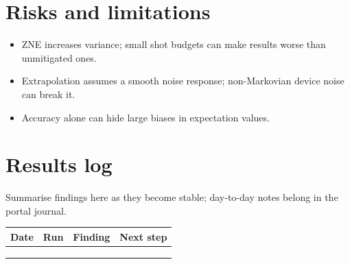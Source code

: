 \documentclass[11pt,a4paper]{article}
\begin{document}
\section{Risks and limitations}
\begin{itemize}
  \item ZNE increases variance; small shot budgets can make results worse than unmitigated ones.
  \item Extrapolation assumes a smooth noise response; non-Markovian device noise can break it.
  \item Accuracy alone can hide large biases in expectation values.
\end{itemize}

\section{Results log}
\label{sec:log}
Summarise findings here as they become stable; day-to-day notes belong in the portal journal.

\begin{table}[h]
\centering\small
\begin{tabularx}{\linewidth}{@{}l l >{\raggedright}X >{\raggedright\arraybackslash}X@{}}
\toprule
Date & Run & Finding & Next step \\
\midrule
 & & & \\
 & & & \\
 & & & \\
\bottomrule
\end{tabularx}
\end{table}



\end{document}
